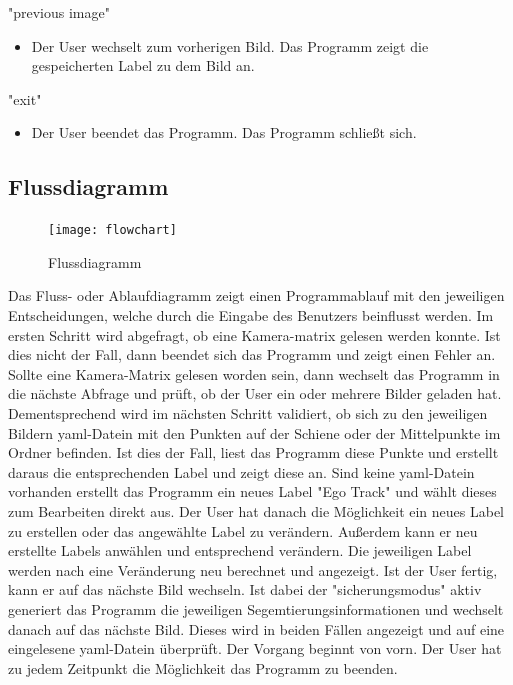 \documentclass[11pt]{scrartcl}
\begin{document}
\noindent
"previous image"

\begin{itemize}
	\item Der User wechselt zum vorherigen Bild. Das Programm zeigt die gespeicherten Label zu dem Bild an.
\end{itemize}

\noindent
"exit"
\begin{itemize}
	\item Der User beendet das Programm. Das Programm schließt sich.
\end{itemize}

\subsection{Flussdiagramm}
\label{sec:Flussdiagramm}
\begin{figure}[H]
  \texttt{[image: flowchart]}
  \caption{Flussdiagramm}
\end{figure}

Das Fluss- oder Ablaufdiagramm zeigt einen Programmablauf mit den jeweiligen Entscheidungen, welche durch die Eingabe des Benutzers beinflusst werden.
Im ersten Schritt wird abgefragt, ob eine Kamera-matrix gelesen werden konnte. Ist dies nicht der Fall, dann beendet sich das Programm und zeigt einen Fehler an. Sollte eine Kamera-Matrix gelesen worden sein, dann wechselt das Programm in die nächste Abfrage und prüft, ob der User ein oder mehrere Bilder geladen hat. Dementsprechend wird im nächsten Schritt validiert, ob sich zu den jeweiligen Bildern yaml-Datein mit den Punkten auf der Schiene oder der Mittelpunkte im Ordner befinden. Ist dies der Fall, liest das Programm diese Punkte und erstellt daraus die entsprechenden Label und zeigt diese an. Sind keine yaml-Datein vorhanden erstellt das Programm ein neues Label "Ego Track" und wählt dieses zum Bearbeiten direkt aus. Der User hat danach die Möglichkeit ein neues Label zu erstellen oder das angewählte Label zu verändern. Außerdem kann er neu erstellte Labels anwählen und entsprechend verändern. Die jeweiligen Label werden nach eine Veränderung neu berechnet und angezeigt. Ist der User fertig, kann er auf das nächste Bild wechseln. Ist dabei der "sicherungsmodus" aktiv generiert das Programm die jeweiligen Segemtierungsinformationen und wechselt danach auf das nächste Bild. Dieses wird in beiden Fällen angezeigt und auf eine eingelesene yaml-Datein überprüft. Der Vorgang beginnt von vorn. Der User hat zu jedem Zeitpunkt die Möglichkeit das Programm zu beenden.
\end{document}

